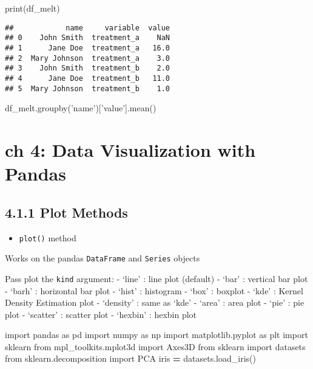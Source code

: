 \documentclass[]{book}
\newenvironment{Shaded}{\begin{snugshade}}{\end{snugshade}}
\newcommand{\BuiltInTok}[1]{#1}
\newcommand{\ImportTok}[1]{#1}
\newcommand{\NormalTok}[1]{#1}
\newcommand{\OperatorTok}[1]{\textcolor[rgb]{0.81,0.36,0.00}{\textbf{#1}}}
\newcommand{\StringTok}[1]{\textcolor[rgb]{0.31,0.60,0.02}{#1}}
\providecommand{\tightlist}{%
  \setlength{\itemsep}{0pt}\setlength{\parskip}{0pt}}
\theoremstyle{definition}
\theoremstyle{definition}
\theoremstyle{definition}
\theoremstyle{remark}
\begin{document}
\begin{Shaded}
\begin{Highlighting}[]
\BuiltInTok{print}\NormalTok{(df_melt)}
\end{Highlighting}
\end{Shaded}

\begin{verbatim}
##            name     variable  value
## 0    John Smith  treatment_a    NaN
## 1      Jane Doe  treatment_a   16.0
## 2  Mary Johnson  treatment_a    3.0
## 3    John Smith  treatment_b    2.0
## 4      Jane Doe  treatment_b   11.0
## 5  Mary Johnson  treatment_b    1.0
\end{verbatim}

\begin{Shaded}
\begin{Highlighting}[]
\NormalTok{df_melt.groupby(}\StringTok{'name'}\NormalTok{)[}\StringTok{'value'}\NormalTok{].mean()}
\end{Highlighting}
\end{Shaded}

\hypertarget{ch-4-data-visualization-with-pandas}{%
\chapter{ch 4: Data Visualization with
Pandas}\label{ch-4-data-visualization-with-pandas}}

\hypertarget{plot-methods}{%
\section{4.1.1 Plot Methods}\label{plot-methods}}

\begin{itemize}
\tightlist
\item
  \texttt{plot()} method
\end{itemize}

Works on the pandas \texttt{DataFrame} and \texttt{Series} objects

Pass plot the \texttt{kind} argument: - `line' : line plot (default) -
`bar' : vertical bar plot - `barh' : horizontal bar plot - `hist' :
histogram - `box' : boxplot - `kde' : Kernel Density Estimation plot -
`density' : same as `kde' - `area' : area plot - `pie' : pie plot -
`scatter' : scatter plot - `hexbin' : hexbin plot

\begin{Shaded}
\begin{Highlighting}[]
\ImportTok{import}\NormalTok{ pandas }\ImportTok{as}\NormalTok{ pd}
\ImportTok{import}\NormalTok{ numpy }\ImportTok{as}\NormalTok{ np}
\ImportTok{import}\NormalTok{ matplotlib.pyplot }\ImportTok{as}\NormalTok{ plt}
\ImportTok{import}\NormalTok{ sklearn}
\ImportTok{from}\NormalTok{ mpl_toolkits.mplot3d }\ImportTok{import}\NormalTok{ Axes3D}
\ImportTok{from}\NormalTok{ sklearn }\ImportTok{import}\NormalTok{ datasets}
\ImportTok{from}\NormalTok{ sklearn.decomposition }\ImportTok{import}\NormalTok{ PCA}
\NormalTok{iris }\OperatorTok{=}\NormalTok{ datasets.load_iris()}
\end{Highlighting}
\end{Shaded}
\end{document}
